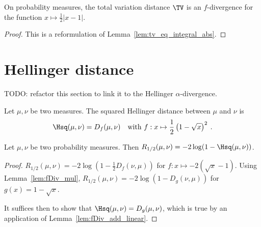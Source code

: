 
\begin{lemma}
  \label{lem:tv_eq_fDiv}
  \leanok
  On probability measures, the total variation distance $\TV$ is an $f$-divergence for the function $x \mapsto \frac{1}{2}\vert x - 1 \vert$.
\end{lemma}

\begin{proof}\leanok
{}
This is a reformulation of Lemma~\ref{lem:tv_eq_integral_abs}.
\end{proof}

\section{Hellinger distance}

TODO: refactor this section to link it to the Hellinger $\alpha$-divergence.

\begin{definition}
  \label{def:Hellinger}
  Let $\mu, \nu$ be two measures. The squared Hellinger distance between $\mu$ and $\nu$ is
  \begin{align*}
    \Hsq(\mu, \nu) = D_f(\mu, \nu) \quad \text{with } f: x \mapsto \frac{1}{2}\left( 1 - \sqrt{x} \right)^2 \: .
  \end{align*}
\end{definition}

\begin{lemma}
  \label{lem:renyi_half_eq_log_hellinger}
  Let $\mu, \nu$ be two probability measures. Then $R_{1/2}(\mu, \nu) = -2\log(1 - \Hsq(\mu, \nu))$.
\end{lemma}

\begin{proof}
$R_{1/2}(\mu, \nu) = -2 \log (1 - \frac{1}{2} D_f(\nu, \mu))$ for $f : x \mapsto -2 (\sqrt{x} - 1)$. Using Lemma~\ref{lem:fDiv_mul}, $R_{1/2}(\mu, \nu) = -2 \log (1 - D_g(\nu, \mu))$ for $g(x) = 1 - \sqrt{x}$.

It suffices then to show that $\Hsq(\mu, \nu) = D_g(\mu, \nu)$, which is true by an application of Lemma~\ref{lem:fDiv_add_linear}.
\end{proof}

